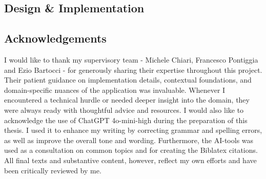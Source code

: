 \documentclass[11pt]{report}
\begin{document}
\begin{refsection}
  \part{Design \& Implementation}
  
\end{refsection}

\cleardoublepage
\printbibliography[heading=subbibliography,title={Foundations},section=1]
\printbibliography[heading=subbibliography,title={Technological Implementation},section=2]


\appendix

\clearpage
\chapter{Acknowledgements}

\noindent I would like to thank my supervisory team - Michele Chiari, Francesco Pontiggia and Ezio Bartocci - for generously sharing their expertise throughout this project.
Their patient guidance on implementation details, contextual foundations, and domain-specific nuances of the application was invaluable. Whenever I encountered a technical
hurdle or needed deeper insight into the domain, they were always ready with thoughtful advice and resources.
\vspace{1ex}
\noindent I would also like to acknowledge the use of ChatGPT 4o-mini-high during the preparation of this thesis. I used it to enhance my writing by correcting grammar
and spelling errors, as well as improve the overall tone and wording.
Furthermore, the AI-tools was used as a consultation on common topics and for creating the Biblatex citations.
All final texts and substantive content, however, reflect my own efforts and have been critically reviewed by me.
\clearpage
\end{document}
